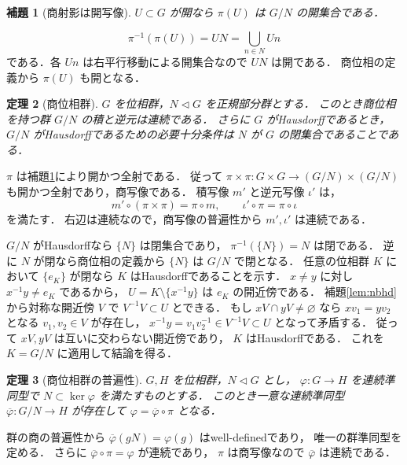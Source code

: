 \documentclass[a5paper,10pt,onecolumn]{jsarticle}
\makeatletter
\theoremstyle{mathnotetheorem}
\newtheorem{theorem}{定理}[section]
\newtheorem{lemma}[theorem]{補題}
\renewcommand{\proofname}{証明}
\renewenvironment{proof}[1][\proofname]{%
  \par\pushQED{\qed}\normalfont\topsep4\p@\@plus2\p@\relax
  \trivlist\item[\hskip\labelsep\bfseries #1]\ignorespaces
}{\popQED\endtrivlist\@endpefalse}
\makeatother
\begin{document}
\begin{lemma}[商射影は開写像]\label{lem:quotient-open}
$U\subset G$ が開なら $\pi(U)$ は $G/N$ の開集合である．
\end{lemma}
\begin{proof}
\[
 \pi^{-1}(\pi(U))=UN=\bigcup_{n\in N}Un
\]
である．各 $Un$ は右平行移動による開集合なので
$UN$ は開である．
商位相の定義から $\pi(U)$ も開となる．
\end{proof}

\begin{theorem}[商位相群]\label{thm:quotient}
$G$ を位相群，$N\triangleleft G$ を正規部分群とする．
このとき商位相を持つ群 $G/N$ の積と逆元は連続である．
さらに $G$ がHausdorffであるとき，
$G/N$ がHausdorffであるための必要十分条件は
$N$ が $G$ の閉集合であることである．
\end{theorem}
\begin{proof}
$\pi$ は補題\ref{lem:quotient-open}により開かつ全射である．
従って $\pi\times\pi:G\times G\to(G/N)\times(G/N)$
も開かつ全射であり，商写像である．
積写像 $m'$ と逆元写像 $\iota'$ は，
\[
 m'\circ(\pi\times\pi)=\pi\circ m,\qquad
 \iota'\circ\pi=\pi\circ\iota
\]
を満たす．
右辺は連続なので，商写像の普遍性から
$m',\iota'$ は連続である．

$G/N$ がHausdorffなら $\{N\}$ は閉集合であり，
$\pi^{-1}(\{N\})=N$ は閉である．
逆に $N$ が閉なら商位相の定義から
$\{N\}$ は $G/N$ で閉となる．
任意の位相群 $K$ において $\{e_K\}$ が閉なら
$K$ はHausdorffであることを示す．
$x\ne y$ に対し $x^{-1}y\ne e_K$ であるから，
$U=K\setminus\{x^{-1}y\}$ は $e_K$ の開近傍である．
補題\ref{lem:nbhd}から対称な開近傍 $V$ で
$V^{-1}V\subset U$ とできる．
もし $xV\cap yV\ne\varnothing$ なら
$xv_1=yv_2$ となる $v_1,v_2\in V$ が存在し，
$x^{-1}y=v_1v_2^{-1}\in V^{-1}V\subset U$
となって矛盾する．
従って $xV,yV$ は互いに交わらない開近傍であり，
$K$ はHausdorffである．
これを $K=G/N$ に適用して結論を得る．
\end{proof}

\begin{theorem}[商位相群の普遍性]\label{thm:quotient-universal}
$G,H$ を位相群，$N\triangleleft G$ とし，
$\varphi:G\to H$ を連続準同型で
$N\subset\ker\varphi$ を満たすものとする．
このとき一意な連続準同型
$\overline\varphi:G/N\to H$ が存在して
$\varphi=\overline\varphi\circ\pi$ となる．
\end{theorem}
\begin{proof}
群の商の普遍性から
$\overline\varphi(gN)=\varphi(g)$ はwell-definedであり，
唯一の群準同型を定める．
さらに $\overline\varphi\circ\pi=\varphi$ が連続であり，
$\pi$ は商写像なので
$\overline\varphi$ は連続である．
\end{proof}
\end{document}
